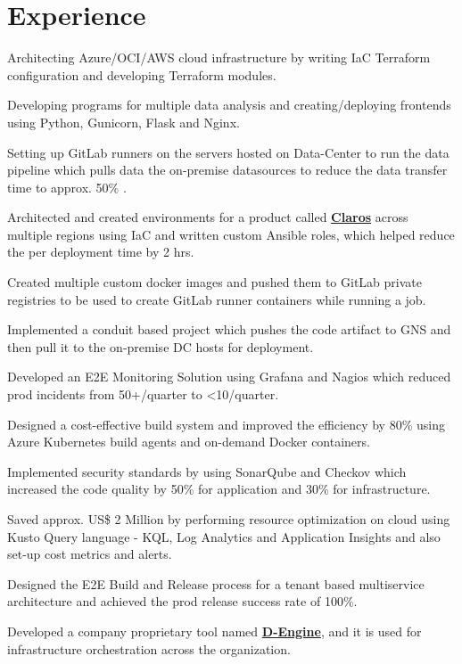 \documentclass[a4paper]{deedy-resume-openfont}
\begin{document}
\begin{minipage}[t]{0.66\textwidth}
\section{Experience}
\vspace{\topsep} %
\begin{tightemize} %
\item Architecting Azure/OCI/AWS cloud infrastructure by writing IaC Terraform configuration and developing Terraform modules.
\item Developing programs for multiple data analysis and creating/deploying frontends using Python, Gunicorn, Flask and Nginx.
\item Setting up GitLab runners on the servers hosted on Data-Center to run the data pipeline which pulls data the on-premise datasources to reduce the data transfer time to approx. 50\% .
\item Architected and created environments for a product called \href{https://www.hach.com/claros/overview#claros-video}{\bf Claros} across multiple regions using IaC and written custom Ansible roles, which helped reduce the per deployment time by 2 hrs.
\item Created multiple custom docker images and pushed them to GitLab private registries to be used to create GitLab runner containers while running a job.
\item Implemented a conduit based project which pushes the code artifact to GNS and then pull it to the on-premise DC hosts for deployment.
\item Developed an E2E Monitoring Solution using Grafana and Nagios which reduced prod incidents from 50+/quarter to <10/quarter.
\item Designed a cost-effective build system and improved the efficiency by 80\% using Azure Kubernetes build agents and on-demand Docker containers.
\item Implemented security standards by using SonarQube and Checkov which increased the code quality by 50\% for application and 30\% for infrastructure.
\item Saved approx. US\$ 2 Million by performing resource optimization on cloud using Kusto Query language - KQL, Log Analytics and Application Insights and also set-up cost metrics and alerts.
\item Designed the E2E Build and Release process for a tenant based multiservice architecture and achieved the prod release success rate of 100\%.
\item Developed a company proprietary tool named \href{https://www.youtube.com/watch?v=YWLU2OU13tA}{\bf D-Engine}, and it is used for infrastructure orchestration across the organization.

\end{tightemize}
\end{minipage}
\end{document}
